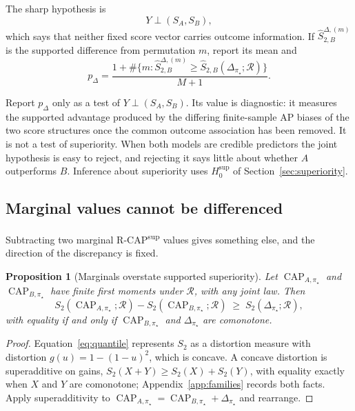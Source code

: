 \documentclass[11pt]{article}
\newcommand{\CAP}{\operatorname{CAP}}
\newcommand{\Regime}{\mathcal{R}}
\newtheorem{proposition}{Proposition}
\theoremstyle{remark}
\begin{document}
The sharp hypothesis is
\[
Y\perp(S_A,S_B),
\]
which says that neither fixed score vector carries outcome information. If $\widehat S_{2,B}^{\Delta,(m)}$ is the supported difference from permutation $m$, report its mean and
\[
p_\Delta
=
\frac{
1+\#\{m:\widehat S_{2,B}^{\Delta,(m)}
\geq \widehat S_{2,B}(\Delta_{\pi_\star};\Regime)\}
}{M+1}.
\]

Report $p_\Delta$ only as a test of $Y\perp(S_A,S_B)$. Its value is diagnostic: it measures the supported advantage produced by the differing finite-sample AP biases of the two score structures once the common outcome association has been removed. It is not a test of superiority. When both models are credible predictors the joint hypothesis is easy to reject, and rejecting it says little about whether $A$ outperforms $B$. Inference about superiority uses $H_0^{\mathrm{sup}}$ of Section~\ref{sec:superiority}.

\subsection{Marginal values cannot be differenced}

Subtracting two marginal R-CAP\textsuperscript{sup} values gives something else, and the direction of the discrepancy is fixed.

\begin{proposition}[Marginals overstate supported superiority]
Let $\CAP_{A,\pi_\star}$ and $\CAP_{B,\pi_\star}$ have finite first moments under $\Regime$, with any joint law. Then
\[
S_2(\CAP_{A,\pi_\star};\Regime)
-
S_2(\CAP_{B,\pi_\star};\Regime)
\;\geq\;
S_2(\Delta_{\pi_\star};\Regime),
\]
with equality if and only if $\CAP_{B,\pi_\star}$ and $\Delta_{\pi_\star}$ are comonotone.
\end{proposition}

\begin{proof}
Equation~\eqref{eq:quantile} represents $S_2$ as a distortion measure with distortion $g(u)=1-(1-u)^2$, which is concave. A concave distortion is superadditive on gains, $S_2(X+Y)\geq S_2(X)+S_2(Y)$, with equality exactly when $X$ and $Y$ are comonotone; Appendix~\ref{app:families} records both facts. Apply superadditivity to $\CAP_{A,\pi_\star}=\CAP_{B,\pi_\star}+\Delta_{\pi_\star}$ and rearrange.
\end{proof}
\end{document}

